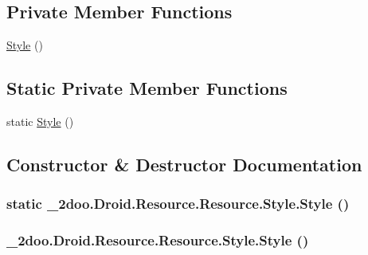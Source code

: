 \subsection*{Private Member Functions}
\begin{CompactItemize}
\item 
\hyperlink{class__2doo_1_1_droid_1_1_resource_1_1_style_40b2204fd2a9ea5876d66f7b1403ad2b}{Style} ()
\end{CompactItemize}
\subsection*{Static Private Member Functions}
\begin{CompactItemize}
\item 
static \hyperlink{class__2doo_1_1_droid_1_1_resource_1_1_style_01969852010d382a25a32c8b87233a75}{Style} ()
\end{CompactItemize}


\subsection{Constructor \& Destructor Documentation}
\hypertarget{class__2doo_1_1_droid_1_1_resource_1_1_style_01969852010d382a25a32c8b87233a75}{
\subsubsection[{Style}]{\setlength{\rightskip}{0pt plus 5cm}static \_\-2doo.Droid.Resource.Resource.Style.Style ()}}
\label{class__2doo_1_1_droid_1_1_resource_1_1_style_01969852010d382a25a32c8b87233a75}


\hypertarget{class__2doo_1_1_droid_1_1_resource_1_1_style_40b2204fd2a9ea5876d66f7b1403ad2b}{
\subsubsection[{Style}]{\setlength{\rightskip}{0pt plus 5cm}\_\-2doo.Droid.Resource.Resource.Style.Style ()}}
\label{class__2doo_1_1_droid_1_1_resource_1_1_style_40b2204fd2a9ea5876d66f7b1403ad2b}





